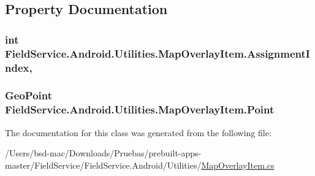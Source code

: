 \subsection{Property Documentation}
\hypertarget{class_field_service_1_1_android_1_1_utilities_1_1_map_overlay_item_acbc19986d7e7b8271b32788477ace439}{
\subsubsection[{Assignment\+Index}]{\setlength{\rightskip}{0pt plus 5cm}int Field\+Service.\+Android.\+Utilities.\+Map\+Overlay\+Item.\+Assignment\+Index\hspace{0.3cm}{\ttfamily [get]}, {\ttfamily [set]}}}\label{class_field_service_1_1_android_1_1_utilities_1_1_map_overlay_item_acbc19986d7e7b8271b32788477ace439}
\hypertarget{class_field_service_1_1_android_1_1_utilities_1_1_map_overlay_item_aac170dd1442e6067e0524800b9af4538}{
\subsubsection[{Point}]{\setlength{\rightskip}{0pt plus 5cm}Geo\+Point Field\+Service.\+Android.\+Utilities.\+Map\+Overlay\+Item.\+Point\hspace{0.3cm}{\ttfamily [get]}}}\label{class_field_service_1_1_android_1_1_utilities_1_1_map_overlay_item_aac170dd1442e6067e0524800b9af4538}


The documentation for this class was generated from the following file\+:\begin{DoxyCompactItemize}
\item 
/\+Users/bsd-\/mac/\+Downloads/\+Pruebas/prebuilt-\/apps-\/master/\+Field\+Service/\+Field\+Service.\+Android/\+Utilities/\hyperlink{_map_overlay_item_8cs}{Map\+Overlay\+Item.\+cs}\end{DoxyCompactItemize}
